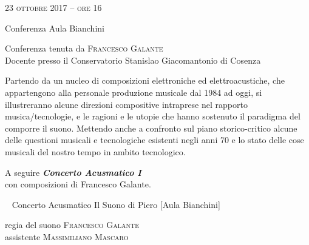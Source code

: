 
\begin{flushright}

\large{
	\scshape{
	23 ottobre 2017 -- ore 16
	}}

\medskip
	
\small{Conferenza
	\newline Aula Bianchini}

\medskip

{\fontsize{18}{18} }

\normalfont

\normalsize

\bigskip

Conferenza tenuta da \textsc{Francesco Galante}\\{\footnotesize Docente presso il Conservatorio Stanislao Giacomantonio di Cosenza}

\bigskip

Partendo da un nucleo di composizioni elettroniche ed elettroacustiche, che appartengono alla personale produzione musicale dal 1984 ad oggi, si illustreranno alcune  direzioni compositive intraprese nel rapporto musica/tecnologie, e le ragioni e le utopie  che hanno sostenuto il paradigma del comporre il suono. Mettendo anche a confronto sul piano storico-critico alcune delle questioni musicali e tecnologiche esistenti negli anni 70 e lo stato delle cose musicali del nostro tempo in ambito tecnologico.

\bigskip

A seguire \textbf{\emph{Concerto Acusmatico I}}\\
con composizioni di Francesco Galante.



~\vfill
%
%	
\small{Concerto Acusmatico
	\newline Il Suono di Piero [Aula Bianchini]}

\medskip


{\fontsize{20}{20} }

\normalsize

\medskip

regia del suono \textsc{Francesco Galante}\\
assistente \textsc{Massimiliano Mascaro}

\bigskip


\end{flushright}
